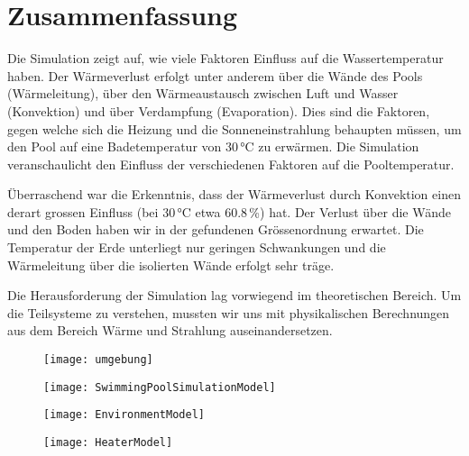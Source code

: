 \section{Zusammenfassung}
\label{sec:Zusammenfassung}
Die Simulation zeigt auf, wie viele Faktoren Einfluss auf die Wassertemperatur haben. Der Wärmeverlust erfolgt unter anderem über die Wände des Pools (Wärmeleitung), über den Wärmeaustausch zwischen Luft und Wasser (Konvektion) und über Verdampfung (Evaporation). Dies sind die Faktoren, gegen welche sich die Heizung und die Sonneneinstrahlung behaupten müssen, um den Pool auf eine Badetemperatur von 30\,°C zu erwärmen. Die Simulation veranschaulicht den Einfluss der verschiedenen Faktoren auf die Pooltemperatur.

Überraschend war die Erkenntnis, dass der Wärmeverlust durch Konvektion einen derart grossen Einfluss (bei 30\,°C etwa 60.8\,\%) hat. Der Verlust über die Wände und den Boden haben wir in der gefundenen Grössenordnung erwartet. Die Temperatur der Erde unterliegt nur geringen Schwankungen und die Wärmeleitung über die isolierten Wände erfolgt sehr träge.

Die Herausforderung der Simulation lag vorwiegend im theoretischen Bereich. Um die Teilsysteme zu verstehen, mussten wir uns mit physikalischen Berechnungen aus dem Bereich Wärme und Strahlung auseinandersetzen.




\begin{figure}[H]
	\centering
	\texttt{[image: umgebung]}
	\caption{}
	\label{fig:umgebung}
\end{figure}




\begin{figure}[H]
	\centering
	\texttt{[image: SwimmingPoolSimulationModel]}
	\caption{}
	\label{fig:SwimmingPoolSimulationModel}
\end{figure}
\begin{figure}[H]
	\centering
	\texttt{[image: EnvironmentModel]}
	\caption{}
	\label{fig:EnvironmentModel}
\end{figure}

\begin{figure}[H]
	\centering
	\texttt{[image: HeaterModel]}
	\caption{}
	\label{fig:HeaterModel}
\end{figure}


